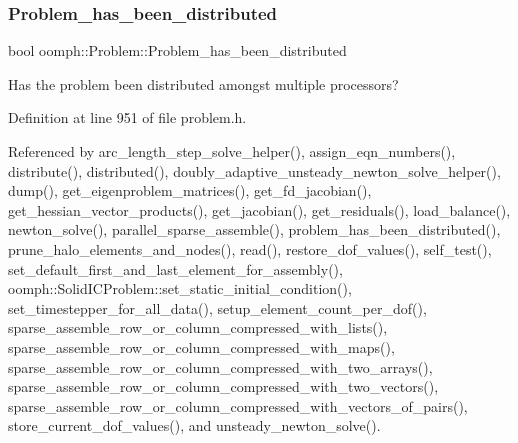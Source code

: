 \subsubsection{\texorpdfstring{Problem\+\_\+has\+\_\+been\+\_\+distributed}{Problem\_has\_been\_distributed}}
{\footnotesize\ttfamily bool oomph\+::\+Problem\+::\+Problem\+\_\+has\+\_\+been\+\_\+distributed\hspace{0.3cm}{\ttfamily [protected]}}



Has the problem been distributed amongst multiple processors? 



Definition at line 951 of file problem.\+h.



Referenced by arc\+\_\+length\+\_\+step\+\_\+solve\+\_\+helper(), assign\+\_\+eqn\+\_\+numbers(), distribute(), distributed(), doubly\+\_\+adaptive\+\_\+unsteady\+\_\+newton\+\_\+solve\+\_\+helper(), dump(), get\+\_\+eigenproblem\+\_\+matrices(), get\+\_\+fd\+\_\+jacobian(), get\+\_\+hessian\+\_\+vector\+\_\+products(), get\+\_\+jacobian(), get\+\_\+residuals(), load\+\_\+balance(), newton\+\_\+solve(), parallel\+\_\+sparse\+\_\+assemble(), problem\+\_\+has\+\_\+been\+\_\+distributed(), prune\+\_\+halo\+\_\+elements\+\_\+and\+\_\+nodes(), read(), restore\+\_\+dof\+\_\+values(), self\+\_\+test(), set\+\_\+default\+\_\+first\+\_\+and\+\_\+last\+\_\+element\+\_\+for\+\_\+assembly(), oomph\+::\+Solid\+I\+C\+Problem\+::set\+\_\+static\+\_\+initial\+\_\+condition(), set\+\_\+timestepper\+\_\+for\+\_\+all\+\_\+data(), setup\+\_\+element\+\_\+count\+\_\+per\+\_\+dof(), sparse\+\_\+assemble\+\_\+row\+\_\+or\+\_\+column\+\_\+compressed\+\_\+with\+\_\+lists(), sparse\+\_\+assemble\+\_\+row\+\_\+or\+\_\+column\+\_\+compressed\+\_\+with\+\_\+maps(), sparse\+\_\+assemble\+\_\+row\+\_\+or\+\_\+column\+\_\+compressed\+\_\+with\+\_\+two\+\_\+arrays(), sparse\+\_\+assemble\+\_\+row\+\_\+or\+\_\+column\+\_\+compressed\+\_\+with\+\_\+two\+\_\+vectors(), sparse\+\_\+assemble\+\_\+row\+\_\+or\+\_\+column\+\_\+compressed\+\_\+with\+\_\+vectors\+\_\+of\+\_\+pairs(), store\+\_\+current\+\_\+dof\+\_\+values(), and unsteady\+\_\+newton\+\_\+solve().

\mbox{\label{classoomph_1_1Problem_ade2d3efba34f69aafaefc076ddb3b8d4}} 
